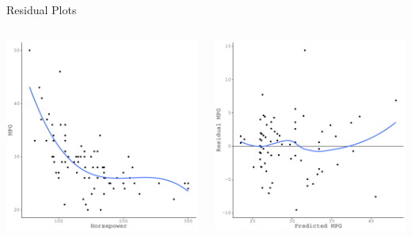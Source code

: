 \documentclass[10pt]{beamer}\usepackage[]{graphicx}\usepackage[]{color}
\makeatletter
\def\maxwidth{ %
  \ifdim\Gin@nat@width>\linewidth
    \linewidth
  \else
    \Gin@nat@width
  \fi
}
\newenvironment{knitrout}{}{} %
\makeatother
\begin{document}
{\begin{frame}{Residual Plots}
\begin{columns}
\begin{column}{0.5\textwidth}
\begin{knitrout}
{\centering \includegraphics[width=\maxwidth]{figure/assumptions-unnamed-chunk-17-1} 

}


\end{knitrout}

\end{column}

\begin{column}{0.5\textwidth}

\begin{knitrout}\footnotesize
{}\color{fgcolor}

{\centering \includegraphics[width=\maxwidth]{figure/assumptions-unnamed-chunk-18-1} 

}
\end{knitrout}
\end{column}
\end{columns}
\end{frame}}
\end{document}
